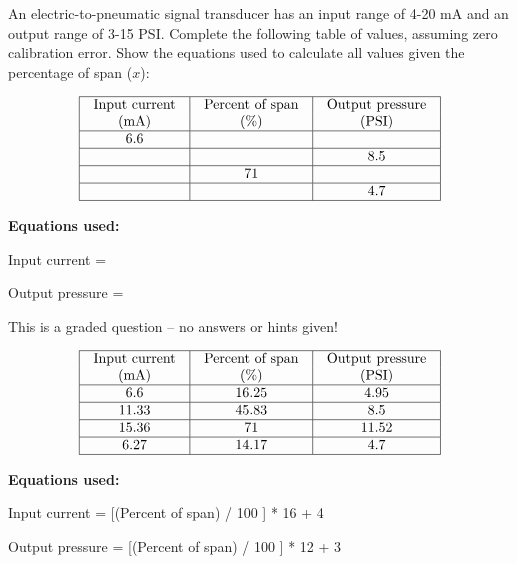 

An electric-to-pneumatic signal transducer has an input range of 4-20 mA and an output range of 3-15 PSI.  Complete the following table of values, assuming zero calibration error.  Show the equations used to calculate all values given the percentage of span ($x$):


$$\vbox{\offinterlineskip
\halign{\strut
\vrule \quad\hfil # \ \hfil & 
\vrule \quad\hfil # \ \hfil & 
\vrule \quad\hfil # \ \hfil \vrule \cr
\noalign{\hrule}
%
Input current & Percent of span & Output pressure \cr
%
(mA) & (\%) & (PSI) \cr
%
\noalign{\hrule}
%
6.6 &  &  \cr
%
\noalign{\hrule}
%
 &  & 8.5 \cr
%
\noalign{\hrule}
%
 & 71 &  \cr
%
\noalign{\hrule}
%
 &  & 4.7 \cr
%
\noalign{\hrule}
} %
}$$ %

\vskip 10pt

\noindent
{\bf Equations used:}

\vskip 20pt

Input current = 

\vskip 20pt

Output pressure = 

\vfil

\eject






This is a graded question -- no answers or hints given!








$$\vbox{\offinterlineskip
\halign{\strut
\vrule \quad\hfil # \ \hfil & 
\vrule \quad\hfil # \ \hfil & 
\vrule \quad\hfil # \ \hfil \vrule \cr
\noalign{\hrule}
%
Input current & Percent of span & Output pressure \cr
%
(mA) & (\%) & (PSI) \cr
%
\noalign{\hrule}
%
6.6 & 16.25 & 4.95 \cr
%
\noalign{\hrule}
%
11.33 & 45.83 & 8.5 \cr
%
\noalign{\hrule}
%
15.36 & 71 & 11.52 \cr
%
\noalign{\hrule}
%
6.27 & 14.17 & 4.7 \cr
%
\noalign{\hrule}
} %
}$$ %

\vskip 10pt

\noindent
{\bf Equations used:}

\vskip 20pt

Input current = [(Percent of span) / 100 ] * 16 + 4

\vskip 20pt

Output pressure = [(Percent of span) / 100 ] * 12 + 3





